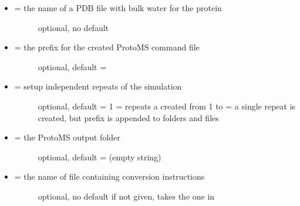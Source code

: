 \documentclass[letterpaper,10pt,english]{sphinxmanual}
\begin{document}
\begin{itemize}
\begin{description}
\end{description}

\item {} \begin{description}
\item[{ = the name of a PDB file with bulk water for the protein}] \leavevmode
optional, no default

\end{description}

\item {} \begin{description}
\item[{ = the prefix for the created ProtoMS command file}] \leavevmode
optional, default = 

\end{description}

\item {} \begin{description}
\item[{ = setup independent repeats of the simulation}] \leavevmode
optional, default = 1
 = repeats a created from 1 to 
 = a single repeat is created, but prefix is appended to folders and files

\end{description}

\item {} \begin{description}
\item[{ = the ProtoMS output folder}] \leavevmode
optional, default =  (empty string)

\end{description}

\item {} \begin{description}
\item[{ = the name of file containing conversion instructions}] \leavevmode
optional, no default
if not given, takes the one in 

\end{description}


\end{itemize}
\end{document}
